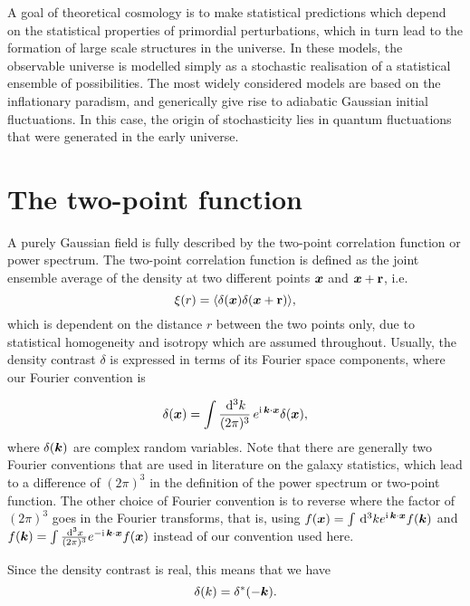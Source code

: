 A goal of theoretical cosmology is to make statistical predictions which depend on the statistical properties of primordial perturbations, which in turn lead to the formation of large scale structures in the universe. In these models, the observable universe is modelled simply as a stochastic realisation of a statistical ensemble of possibilities. The most widely considered models are based on the inflationary paradism, and generically give rise to adiabatic Gaussian initial fluctuations. In this case, the origin of stochasticity lies in quantum fluctuations that were generated in the early universe. 

\section{The two-point function}

A purely Gaussian field is fully described by the two-point correlation function or power spectrum. The two-point correlation function is defined as the joint ensemble average of the density at two different points $\bm {x}$ and $\bm {x} + \textbf{r}$, i.e. 
\begin{equation}
	\xi(r) = \langle \delta(\bm {x}) \delta(\bm {x} + \textbf{r}) \rangle,
\end{equation}
which is dependent on the distance $r$ between the two points only, due to statistical homogeneity and isotropy which are assumed throughout. Usually, the density contrast $\delta$ is expressed in terms of its Fourier space components, where our Fourier convention is 

\begin{equation}
	\delta({\bm {x}}) = \int \frac{\,\mathrm{d}^3k}{(2\pi)^3} \, e^{\mathrm{i\,} \bm {k} \cdot \bm {x} } \delta(\bm {x}),
\end{equation}
where $\delta(\bm {k})$ are complex random variables. Note that there are generally two Fourier conventions that are used in literature on the galaxy statistics, which lead to a difference of $(2\pi)^3$ in the definition of the power spectrum or two-point function. The other choice of Fourier convention is to reverse where the factor of $(2\pi)^3$ goes in the Fourier transforms, that is, using $f(\bm {x}) = \int \,\mathrm{d}^3k e^{\mathrm{i\,} \bm {k} \cdot \bm {x}} f(\bm {k}) $ and $f(\bm {k}) = \int \frac{\,\mathrm{d}^3 x}{(2\pi)^3} e^{-\mathrm{i\,} \bm {k} \cdot \bm {x}} f(\bm {x})$ instead of our convention used here.

Since the density contrast is real, this means that we have
\begin{equation}
	\delta(k) = \delta^*(-\bm {k}).
\end{equation}

